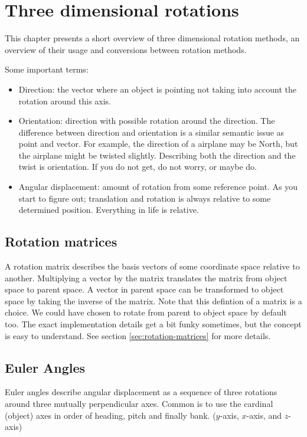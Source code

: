 \section{Three dimensional rotations}

This chapter presents a short overview of three dimensional rotation methods, an overview of their usage and conversions between rotation methods.

Some important terms:

\begin{itemize}
	\item Direction: the vector where an object is pointing not taking into account the rotation around this axis.
	\item Orientation: direction with possible rotation around the direction. The difference between direction and orientation is a similar semantic issue as point and vector. For example, the direction of a airplane may be North, but the airplane might be twisted slightly. Describing both the direction and the twist is orientation. If you do not get, do not worry, or maybe do.
	\item Angular displacement: amount of rotation from some reference point. As you start to figure out; translation and rotation is always relative to some determined position. Everything in life is relative.
\end{itemize}

\subsection{Rotation matrices}

A rotation matrix describes the basis vectors of some coordinate space relative to another. Multiplying a vector by the matrix translates the matrix from object space to parent space. A vector in parent space can be transformed to object space by taking the inverse of the matrix. Note that this defintion of a matrix is a choice. We could have chosen to rotate from parent to object space by default too. The exact implementation details get a bit funky sometimes, but the concept is easy to understand. See section \ref{sec:rotation-matrices} for more details.

\subsection{Euler Angles}

Euler angles describe angular displacement as a sequence of three rotations around three mutually perpendicular axes. Common is to use the cardinal (object) axes in order of heading, pitch and finally bank. ($y$-axis, $x$-axis, and $z$-axis)

